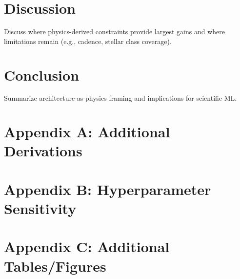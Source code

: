 \documentclass[11pt]{article}
\begin{document}
\section{Discussion}
Discuss where physics-derived constraints provide largest gains and where
limitations remain (e.g., cadence, stellar class coverage).

\section{Conclusion}
Summarize architecture-as-physics framing and implications for scientific ML.




\appendix
\section{Appendix A: Additional Derivations}
\section{Appendix B: Hyperparameter Sensitivity}
\section{Appendix C: Additional Tables/Figures}
\end{document}
